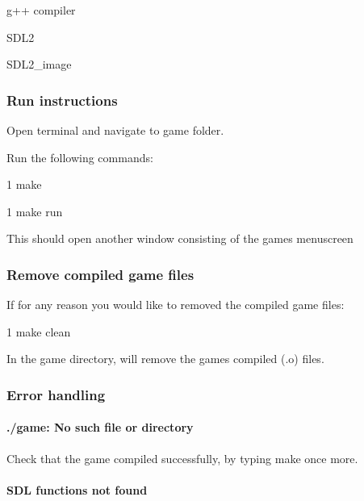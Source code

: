 
\begin{DoxyItemize}
\item g++ compiler
\item S\+D\+L2
\item S\+D\+L2\+\_\+image
\end{DoxyItemize}

\subsubsection*{Run instructions}

Open terminal and navigate to game folder.

Run the following commands\+:


\begin{DoxyCode}
1 make
\end{DoxyCode}



\begin{DoxyCode}
1 make run
\end{DoxyCode}


This should open another window consisting of the game\textquotesingle{}s menuscreen \subsubsection*{Remove compiled game files}

If for any reason you would like to removed the compiled game files\+:


\begin{DoxyCode}
1 make clean
\end{DoxyCode}


In the game directory, will remove the game\textquotesingle{}s compiled (.o) files. \subsubsection*{Error handling}

\paragraph*{./game\+: No such file or directory}

Check that the game compiled successfully, by typing {\ttfamily make} once more.

\paragraph*{S\+D\+L functions not found}

